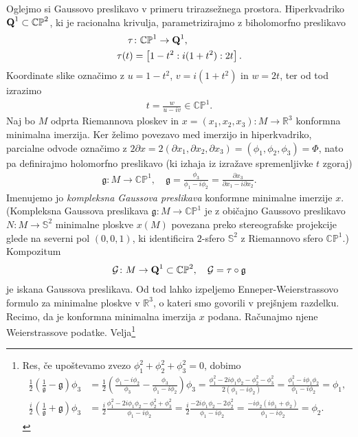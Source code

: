 \documentclass[12pt,a4paper,twoside]{article}
\theoremstyle{definition} %
\theoremstyle{plain} %
\numberwithin{equation}{section}  %
\begin{document}
Oglejmo si Gaussovo preslikavo v primeru trirazsežnega prostora. Hiperkvadriko $\textup{\textbf{Q}}^{1} \subset \mathbb{CP}^{2}$, ki je racionalna krivulja, parametrizirajmo z biholomorfno preslikavo 
\begin{align}
\tau &\colon \mathbb{CP}^{1} \to \textup{\textbf{Q}}^{1}, \nonumber \\
\tau (t) &= \left[ 1-t^2 : i(1+t^2) : 2t \right].
\end{align}
Koordinate slike označimo z $u = 1-t^2$, $v = i(1+t^2)$ in $w = 2t$, ter od tod izrazimo 
\begin{gather*}
t = \frac{w}{u-iv} \in \mathbb{CP}^{1}.
\end{gather*}
Naj bo $M$ odprta Riemannova ploskev in $x = (x_1,x_2,x_3) \colon M \to \mathbb{R}^{3}$ konformna minimalna imerzija. Ker želimo povezavo med imerzijo in hiperkvadriko, parcialne odvode označimo z $2 \partial x = 2 (\partial x_1, \partial x_2, \partial x_3) = (\phi_1, \phi_2, \phi_3) = \Phi$, nato pa definirajmo holomorfno preslikavo (ki izhaja iz izražave spremenljivke $t$ zgoraj)
\begin{gather}
\mathfrak{g} \colon M \to \mathbb{CP}^{1}, \quad \mathfrak{g} = \frac{\phi_3}{\phi_1 - i\phi_2} = \frac{\partial x_3}{\partial x_1 - i \partial x_2}.
\end{gather}
Imenujemo jo \emph{kompleksna Gaussova preslikava} konformne minimalne imerzije $x$.
(Kompleksna Gaussova preslikava $\mathfrak{g} \colon M \to \mathbb{CP}^{1}$ je z običajno Gaussovo preslikavo $N \colon M \to \mathbb{S}^2$ minimalne ploskve $x(M)$ povezana preko stereografske projekcije glede na severni pol $(0,0,1)$, ki identificira $2$-sfero $\mathbb{S}^2$ z Riemannovo sfero $\mathbb{CP}^{1}$.)
Kompozitum 
\begin{align}
\mathcal{G} \colon M \to \textup{\textbf{Q}}^{1} \subset \mathbb{CP}^{2}, \quad \mathcal{G} = \tau \circ \mathfrak{g}
\end{align}
je iskana Gaussova preslikava.\newline
Od tod lahko izpeljemo Enneper-Weierstrassovo formulo za minimalne ploskve v $\mathbb{R}^{3}$, o kateri smo govorili v prejšnjem razdelku. 
Recimo, da je konformna minimalna imerzija $x$ podana. Računajmo njene Weierstrassove podatke. 
Velja\footnote{Res, če upoštevamo zvezo $\phi_{1}^2 + \phi_{2}^2 + \phi_{3}^2 = 0$, dobimo
\begin{align*}
\frac{1}{2} \left(\frac{1}{\mathfrak{g}} - \mathfrak{g} \right) \phi_3 &= \frac{1}{2} \left( \frac{\phi_1 - i\phi_2}{\phi_3} - \frac{\phi_3}{\phi_1 - i\phi_2} \right) \phi_3 = \frac{\phi_{1}^2 - 2i\phi_1 \phi_2 - \phi_{2}^2 - \phi_{3}^2}{2(\phi_1 - i\phi_2)} = \frac{\phi_{1}^2 - i\phi_1\phi_2}{\phi_1 - i\phi_2} = \phi_1, \\
%
\frac{i}{2} \left(\frac{1}{\mathfrak{g}} + \mathfrak{g} \right) \phi_3 &= \frac{i}{2} \frac{\phi_{1}^2 - 2i\phi_1 \phi_2 - \phi_{2}^2 + \phi_{3}^2}{\phi_1 - i\phi_2} = \frac{i}{2} \frac{-2i\phi_1 \phi_2 - 2\phi_{2}^2}{\phi_1 - i\phi_2} = \frac{-i\phi_2(i\phi_1 + \phi_2)}{\phi_1 - i\phi_2} = \phi_2.
\end{align*}
}
\end{document}
